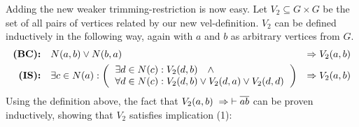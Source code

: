 Adding the new weaker trimming-restriction is now easy.
Let $V_2 \subseteq G \times G$ be the set of all pairs of vertices related by our new vel-definition.
$V_2$ can be defined inductively in the following way, again with $a$ and $b$ as arbitrary vertices from $G$.
\begin{align}
  \textbf{(BC):}&\quad N(a,b) \vee N(b,a) &\Rightarrow V_2(a,b)\label{eq:V2_BC}\\
  \textbf{(IS):}&\quad \exists c \in N(a):
  \left ( \begin{tabular}{l}
  $\exists d \in N(c): V_2(d,b) \quad \wedge$\\
  $\forall d \in N(c): V_2(d,b) \vee V_2(d,a) \vee V_2(d,d)$
  \end{tabular} \right )
  &\Rightarrow V_2(a,b)\label{eq:V2_IS}
\end{align}
Using the definition above, the fact that $V_2(a,b) \;\Rightarrow\; \vdash \ol{ab}$ can be proven inductively, showing that $V_2$ satisfies implication (1):
